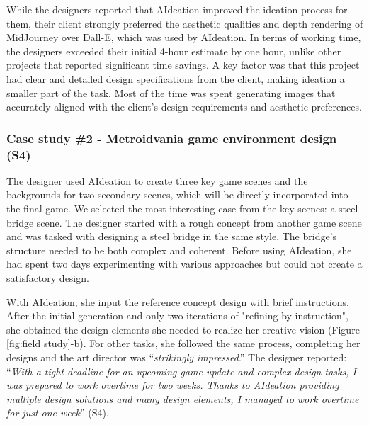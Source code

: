 
While the designers reported that AIdeation improved the ideation process for them, their client strongly preferred the aesthetic qualities and depth rendering of MidJourney over Dall-E, which was used by AIdeation. 
In terms of working time, the designers exceeded their initial 4-hour estimate by one hour, unlike other projects that reported significant time savings. A key factor was that this project had clear and detailed design specifications from the client, making ideation a smaller part of the task. Most of the time was spent generating images that accurately aligned with the client’s design requirements and aesthetic preferences.


\subsubsection{Case study \#2 - Metroidvania game environment design (S4)}
The designer used AIdeation to create three key game scenes and the backgrounds for two secondary scenes, which will be directly incorporated into the final game. We selected the most interesting case from the key scenes: a steel bridge scene. The designer started with a rough concept from another game scene and was tasked with designing a steel bridge in the same style. The bridge's structure needed to be both complex and coherent. Before using AIdeation, she had spent two days experimenting with various approaches but could not create a satisfactory design.

With AIdeation, she input the reference concept design with brief instructions. After the initial generation and only two iterations of "refining by instruction", she obtained the design elements she needed to realize her creative vision (Figure \ref{fig:field study}-b). For other tasks, she followed the same process, completing her designs and the art director was “\textit{strikingly impressed}.” The designer reported: “\textit{With a tight deadline for an upcoming game update and complex design tasks, I was prepared to work overtime for two weeks. Thanks to AIdeation providing multiple design solutions and many design elements, I managed to work overtime for just one week}” (S4).

